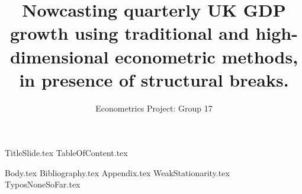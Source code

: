 \documentclass[11pt]{beamer}
\title[Nowcasting]{Nowcasting quarterly UK GDP growth using traditional and high-dimensional econometric methods, in presence of structural breaks.}
\subtitle{Econometrics Project: Group 17}
\begin{document}
% 
{TitleSlide.tex}
{TableOfContent.tex}

{Body.tex}
{Bibliography.tex}
{Appendix.tex}
{WeakStationarity.tex}
{TyposNoneSoFar.tex}
\end{document}
